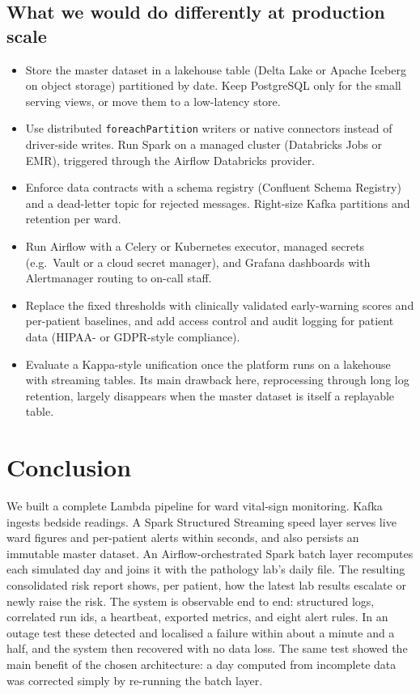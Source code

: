\documentclass[11pt,a4paper]{article}
\newcommand{\code}[1]{\nolinkurl{#1}}
\begin{document}
\subsection{What we would do differently at production scale}
\begin{itemize}
  \item Store the master dataset in a lakehouse table (Delta Lake or Apache Iceberg on object
  storage) partitioned by date. Keep PostgreSQL only for the small serving views, or move them
  to a low-latency store.
  \item Use distributed \code{foreachPartition} writers or native connectors instead of
  driver-side writes. Run Spark on a managed cluster (Databricks Jobs or EMR), triggered through
  the Airflow Databricks provider.
  \item Enforce data contracts with a schema registry (Confluent Schema Registry) and a
  dead-letter topic for rejected messages. Right-size Kafka partitions and retention per ward.
  \item Run Airflow with a Celery or Kubernetes executor, managed secrets (e.g.\ Vault or a cloud
  secret manager), and Grafana dashboards with Alertmanager routing to on-call staff.
  \item Replace the fixed thresholds with clinically validated early-warning scores and
  per-patient baselines, and add access control and audit logging for patient data (HIPAA- or
  GDPR-style compliance).
  \item Evaluate a Kappa-style unification once the platform runs on a lakehouse with streaming
  tables. Its main drawback here, reprocessing through long log retention, largely disappears when
  the master dataset is itself a replayable table.
\end{itemize}

\section{Conclusion}
We built a complete Lambda pipeline for ward vital-sign monitoring. Kafka ingests bedside
readings. A Spark Structured Streaming speed layer serves live ward figures and per-patient
alerts within seconds, and also persists an immutable master dataset. An Airflow-orchestrated
Spark batch layer recomputes each simulated day and joins it with the pathology lab's daily
file. The resulting consolidated risk report shows, per patient, how the latest lab results
escalate or newly raise the risk. The system is observable end to end: structured logs,
correlated run ids, a heartbeat, exported metrics, and eight alert rules. In an outage test these
detected and localised a failure within about a minute and a half, and the system then recovered
with no data loss. The same test showed the main benefit of the chosen architecture: a day
computed from incomplete data was corrected simply by re-running the batch layer.
\end{document}
